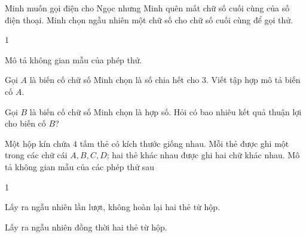 \begin{vd}%
	Minh muốn gọi điện cho Ngọc nhưng Minh quên mất chữ số cuối cùng của số điện thoại. Minh chọn ngẫu nhiên một chữ số cho chữ số cuối cùng để gọi thử.
	\begin{enumEX}[a)]{1}
		\item Mô tả không gian mẫu của phép thử.
		\item Gọi $A$ là biến cố chữ số Minh chọn là số chia hết cho $3$. Viết tập hợp mô tả biến cố $A$.
		\item Gọi $B$ là biến cố chữ số Minh chọn là hợp số. Hỏi có bao nhiêu kết quả thuận lợi cho biến cố $B$?
	\end{enumEX}
\end{vd}

\begin{vd}%
	Một hộp kín chứa $4$ tấm thẻ có kích thước giống nhau. Mỗi thẻ được ghi một trong các chữ cái $A, B, C, D$; hai thẻ khác nhau được ghi hai chữ khác nhau. Mô tả không gian mẫu của các phép thử sau
	\begin{enumEX}[a)]{1}
		\item Lấy ra ngẫu nhiên lần lượt, không hoàn lại hai thẻ từ hộp.
		\item Lấy ra ngẫu nhiên đồng thời hai thẻ từ hộp.
	\end{enumEX}
\end{vd}

